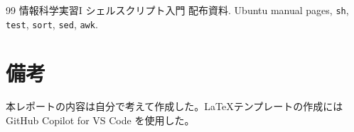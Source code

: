 \documentclass[12pt,a4paper]{jsarticle}
\begin{document}
\newpage

\begin{thebibliography}{99}
 情報科学実習I シェルスクリプト入門 配布資料.
 Ubuntu manual pages, \texttt{sh}, \texttt{test}, \texttt{sort}, \texttt{sed}, \texttt{awk}.

\end{thebibliography}

\section*{備考}
本レポートの内容は自分で考えて作成した。LaTeXテンプレートの作成には GitHub Copilot for VS Code を使用した。
\end{document}
